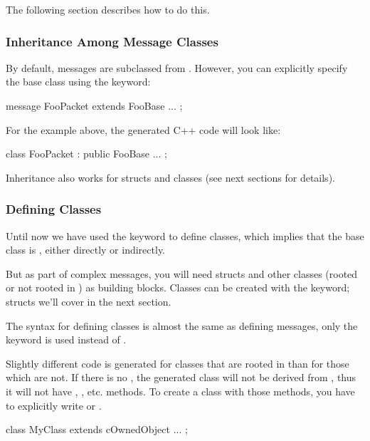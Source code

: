 The following section describes how to do this.


\subsubsection{Inheritance Among Message Classes}

By default, messages are subclassed from . However, you can
explicitly specify the base class using the  keyword:

\begin{msg}
message FooPacket extends FooBase
{
    ...
};
\end{msg}

For the example above, the generated C++ code will look like:

\begin{cpp}
class FooPacket : public FooBase { ... };
\end{cpp}

Inheritance also works for structs and classes (see next sections
for details).



\subsubsection{Defining Classes}

Until now we have used the  keyword to define classes, which
implies that the base class is , either directly or indirectly.

But as part of complex messages, you will need structs and other classes
(rooted or not rooted in ) as building blocks.
Classes can be created with the  keyword;
structs we'll cover in the next section.

The syntax for defining classes is almost the same as defining messages,
only the  keyword is used instead of .

Slightly different code is generated for classes that are rooted in
 than for those which are not.
If there is no , the generated class will not be
derived from , thus it will not have ,
, etc. methods.
To create a class with those methods, you have to explicitly write
 or .

\begin{msg}
class MyClass extends cOwnedObject
{
    ...
};
\end{msg}



